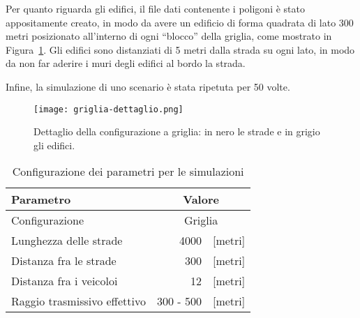 Per quanto riguarda gli edifici, il file dati contenente i poligoni è stato appositamente creato, in modo da avere un edificio di forma quadrata di lato 300 metri
posizionato all'interno di ogni ``blocco'' della griglia, come mostrato in Figura~\ref{fig:griglia-dettaglio}.
Gli edifici sono distanziati di 5 metri dalla strada su ogni lato, in modo da non far aderire i muri degli edifici al bordo la strada.

Infine, la simulazione di uno scenario è stata ripetuta per 50 volte. %
\begin{figure}[!h]
	\centering
	\begin{center}
		\texttt{[image: griglia-dettaglio.png]}	%
	\end{center}
	\label{fig:griglia-dettaglio}\caption{Dettaglio della configurazione a griglia: in nero le strade e in grigio gli edifici.}
\end{figure}
%
\begin{table}[!h]
	\caption{Configurazione dei parametri per le simulazioni}
	\label{tab:parametri-simulazioni-barichello}
	\begin{center}
	  \begin{tabular}{ | m{.5\linewidth} | r  c | }
			\hline
			Parametro											&			\multicolumn{2}{c|}{Valore}			\\ \hline \hline
			Configurazione								&			\multicolumn{2}{c|}{Griglia}		\\ \hline
			Lunghezza delle strade				&			4000 								& [metri]		\\ \hline
			Distanza fra le strade				&			300 								& [metri]		\\ \hline
			Distanza fra i veicoloi 			&			12 									& [metri]		\\ \hline
			Raggio trasmissivo effettivo	&			300 - 500						& [metri]		\\
			\hline
	  \end{tabular}
	\end{center}
\end{table}
